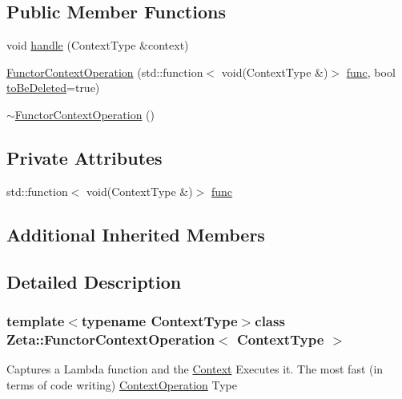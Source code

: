 \subsection*{Public Member Functions}
\begin{DoxyCompactItemize}
\item 
void \hyperlink{classZeta_1_1FunctorContextOperation_aaddb1910026a9c905afb14b5cfc2000e}{handle} (Context\+Type \&context)
\item 
\hyperlink{classZeta_1_1FunctorContextOperation_a24b3a5fd20f5fdec75904615f4fe0edb}{Functor\+Context\+Operation} (std\+::function$<$ void(Context\+Type \&)$>$ \hyperlink{classZeta_1_1FunctorContextOperation_a082fe8d9aa9f4e2689fcf809fd7c218c}{func}, bool \hyperlink{classZeta_1_1ContextOperation_a74d249e9f1614a29999b811772a41c1b}{to\+Be\+Deleted}=true)
\item 
\hyperlink{classZeta_1_1FunctorContextOperation_af23ff142b1cde19d64715065477c5145}{$\sim$\+Functor\+Context\+Operation} ()
\end{DoxyCompactItemize}
\subsection*{Private Attributes}
\begin{DoxyCompactItemize}
\item 
std\+::function$<$ void(Context\+Type \&)$>$ \hyperlink{classZeta_1_1FunctorContextOperation_a082fe8d9aa9f4e2689fcf809fd7c218c}{func}
\end{DoxyCompactItemize}
\subsection*{Additional Inherited Members}


\subsection{Detailed Description}
\subsubsection*{template$<$typename Context\+Type$>$class Zeta\+::\+Functor\+Context\+Operation$<$ Context\+Type $>$}

Captures a Lambda function and the \hyperlink{classZeta_1_1Context}{Context} Executes it. The most fast (in terms of code writing) \hyperlink{classZeta_1_1ContextOperation}{Context\+Operation} Type 


